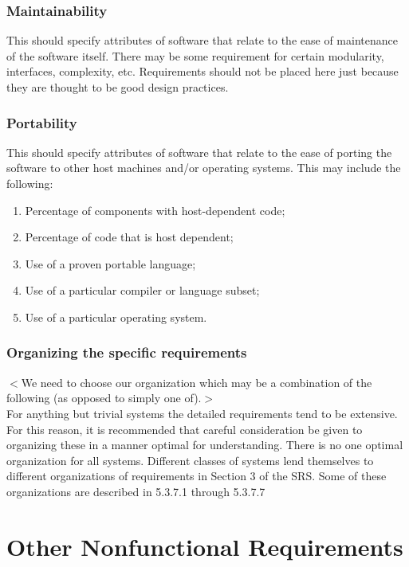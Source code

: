 \documentclass{scrreprt}
\begin{document}
\subsection{Maintainability}
This should specify attributes of software that relate to the ease of
maintenance of the software itself. There may be some requirement for certain
modularity, interfaces, complexity, etc. Requirements should not be placed here
just because they are thought to be good design practices.

\subsection{Portability}
This should specify attributes of software that relate to the ease of porting
the software to other host machines and/or operating systems. This may include
the following:

\begin{enumerate}
	\item Percentage of components with host-dependent code;
	\item Percentage of code that is host dependent;
	\item Use of a proven portable language;
	\item Use of a particular compiler or language subset;
	\item Use of a particular operating system.
\end{enumerate}

\subsection{Organizing the specific requirements}
$<$We need to choose our organization which may be a combination of the
following (as opposed to simply one of).$>$\\
For anything but trivial systems the detailed requirements tend to be extensive.
For this reason, it is recommended that careful consideration be given to
organizing these in a manner optimal for understanding. There is no one optimal
organization for all systems. Different classes of systems lend themselves to
different organizations of requirements in Section 3 of the SRS. Some of these
organizations are described in 5.3.7.1 through 5.3.7.7


\chapter{Other Nonfunctional Requirements}
\end{document}
